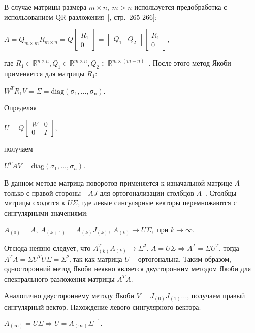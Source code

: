 В случае матрицы размера $m \times n, \ m>n$ используется предобработка с использованием QR-разложения~[, стр.~265-266]: 
\begin{center}
    $A = Q_{m\times m}R_{m\times n} = Q\begin{bmatrix}
        R_1\\0
    \end{bmatrix} = \begin{bmatrix}
        Q_1&Q_2
    \end{bmatrix}
    \begin{bmatrix}
        R_1\\0
    \end{bmatrix},
    $
\end{center}
где $R_1 \in \mathbb{R}^{n\times n}, Q_1 \in \mathbb{R}^{m\times n}, Q_2\in \mathbb{R}^{m\times (m-n)}$~\cite{Golub2013}. После этого метод Якоби применяется для матрицы $R_1$:
\begin{center}
    $W^TR_1V=\Sigma = \mathrm{diag(\sigma_1,...,\sigma_n)}$.
\end{center}
Определяя 
\begin{center}
    $U = Q\begin{bmatrix}
        W&0\\0&I
    \end{bmatrix},$    
\end{center}
получаем
\begin{center}
     $U^TAV = \mathrm{diag}(\sigma_1,...,\sigma_n)$.
\end{center}




В данном методе матрица поворотов применяется к изначальной матрице $A$ только с правой стороны - $AJ$ для ортогонализации столбцов $A$~\cite{Hestenes1958}.
Столбцы матрицы сходятся к $U\Sigma$, где левые сингулярные векторы перемножаются с сингулярными значениями:
\begin{center}
     $A_{(0)}=A,\ A_{(k+1)} = A_{(k)}J_{(k)},\ A_{(k)} \longrightarrow U\Sigma, \text{ при } k\to\infty$.
 \end{center}
 \begin{note}
     Отсюда неявно следует, что $A^T_{(k)}A_{(k)} \to \Sigma^2$. $A = U\Sigma \Rightarrow A^T = \Sigma U^T$, тогда $ A^TA = \Sigma U^TU\Sigma = \Sigma^2, \text{так как матрица } U -\text{ортогональна}.$ Таким образом, односторонний метод Якоби неявно является двусторонним методом Якоби для спектрального разложения матрицы $A^TA$.
 \end{note}
 Аналогично двустороннему методу Якоби $V = J_{(0)}J_{(1)}...$, получаем правый сингулярный вектор. Нахождение левого сингулярного вектора:
 \begin{center}
     $A_{(\infty)} = U\Sigma \Rightarrow U = A_{(\infty)}\Sigma^{-1}.$
 \end{center}

